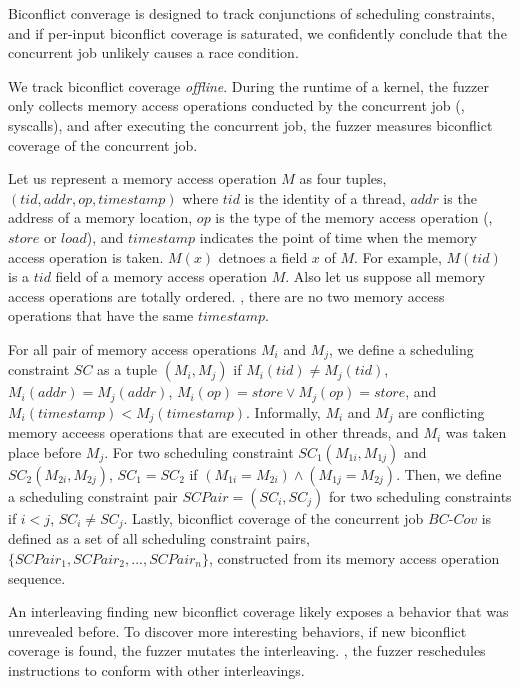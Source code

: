 \newcommand{\mutable}{mutable edge\xspace}
\newcommand{\mutables}{mutable edges\xspace}
\newcommand{\immutable}{immutable edge\xspace}
\newcommand{\immutables}{immutable edges\xspace}
%
Biconflict converage is designed to track conjunctions of scheduling
constraints, and if per-input biconflict coverage is saturated, we
confidently conclude that the concurrent job unlikely causes a race
condition.

We track biconflict coverage \textit{offline}. During the runtime of a
kernel, the fuzzer only collects memory access operations conducted by
the concurrent job (\eg, syscalls), and after executing the concurrent
job, the fuzzer measures biconflict coverage of the concurrent job.

%
Let us represent a memory access operation $M$ as four tuples,
$(tid, addr, op, timestamp)$ where $tid$ is the identity of a thread,
$addr$ is the address of a memory location, $op$ is the type of the
memory access operation (\ie, $store$ or $load$), and $timestamp$
indicates the point of time when the memory access operation is taken.
%
$M(x)$ detnoes a field $x$ of $M$. For example, $M(tid)$ is a $tid$
field of a memory access operation $M$.
%
Also let us suppose all memory access operations are totally
ordered. \ie, there are no two memory access operations that have the
same $timestamp$.

For all pair of memory access operations $M_i$ and $M_j$, we define a
scheduling constraint $SC$ as a tuple $(M_i, M_j)$ if
$M_i(tid) \neq M_j(tid)$, $M_i(addr) = M_j(addr)$,
$M_i(op) = store \vee M_j(op) = store$, and
$M_i(timestamp) < M_j(timestamp)$.
%
Informally, $M_i$ and $M_j$ are conflicting memory acceess operations
that are executed in other threads, and $M_i$ was taken place before
$M_j$.
%
For two scheduling constraint $SC_1(M_{1i}, M_{1j})$ and
$SC_2(M_{2i}, M_{2j})$, $SC_1 = SC_2$ if
$(M_{1i} = M_{2i}) \wedge (M_{1j} = M_{2j})$.
%
Then, we define a scheduling constraint pair $SCPair = (SC_i, SC_j)$
for two scheduling constraints if $i < j$, $SC_i \neq SC_j$.
%
Lastly, biconflict coverage of the concurrent job $BC\mbox{-}Cov$ is
defined as a set of all scheduling constraint pairs,
$\{SCPair_1, SCPair_2, ..., SCPair_n\}$, constructed from its memory
access operation sequence.



%
An interleaving finding new biconflict coverage likely exposes a
behavior that was unrevealed before.
%
To discover more interesting behaviors, if new biconflict coverage is
found, the fuzzer mutates the interleaving. \ie, the fuzzer
reschedules instructions to conform with other interleavings.

